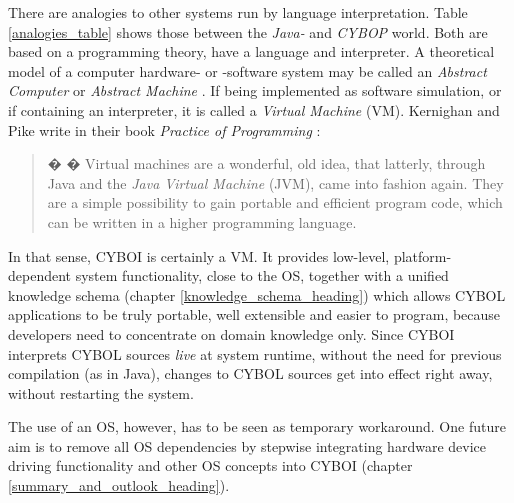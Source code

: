 There are analogies to other systems run by language interpretation. Table
\ref{analogies_table} shows those between the \emph{Java-} and \emph{CYBOP}
world. Both are based on a programming theory, have a language and interpreter.
A theoretical model of a computer hardware- or -software system may be called
an \emph{Abstract Computer} or \emph{Abstract Machine} \cite{wikipedia}. If
being implemented as software simulation, or if containing an interpreter, it
is called a \emph{Virtual Machine} (VM). Kernighan and Pike write in their book
\emph{Practice of Programming} \cite{kernighan1999}:

\begin{quote}
� � Virtual machines are a wonderful, old idea, that latterly, through Java and
    the \emph{Java Virtual Machine} (JVM), came into fashion again. They are a
    simple possibility to gain portable and efficient program code, which can
    be written in a higher programming language.
\end{quote}

In that sense, CYBOI is certainly a VM. It provides low-level, platform-dependent
system functionality, close to the OS, together with a unified knowledge schema
(chapter \ref{knowledge_schema_heading}) which allows CYBOL applications to be
truly portable, well extensible and easier to program, because developers need
to concentrate on domain knowledge only. Since CYBOI interprets CYBOL sources
\emph{live} at system runtime, without the need for previous compilation (as in
Java), changes to CYBOL sources get into effect right away, without restarting
the system.

The use of an OS, however, has to be seen as temporary workaround. One future
aim is to remove all OS dependencies by stepwise integrating hardware device
driving functionality and other OS concepts into CYBOI (chapter
\ref{summary_and_outlook_heading}).
